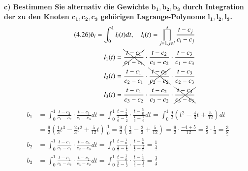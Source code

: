 \documentclass[10pt,a4paper]{article}
\begin{document}
    \textbf{%
        c) Bestimmen Sie alternativ die Gewichte $\pmb{b_1, b_2, b_3}$ durch Integration der zu den Knoten $\pmb{c_1, c_2, c_3}$ gehörigen Lagrange-Polynome $\pmb{l_1, l_2, l_3}$.
    }\\
		\begin{align*}\tag{4.26}
			b_i=\int_{0}^{1}l_i(t)dt, \quad l_i(t)=\prod_{j=1, j\neq i}^{s}\frac{t-c_j}{c_i-c_j} \\
			l_1(t) = \bcancel{\cancel{\frac{t-c_1}{c_1-c_1}}} \cdot \frac{t-c_2}{c_1-c_2} \cdot \frac{t-c_3}{c_1-c_3} \\
			l_2(t) = \frac{t-c_1}{c_2-c_1} \cdot \bcancel{\cancel{\frac{t-c_2}{c_2-c_2}}} \cdot  \frac{t-c_3}{c_2-c_3} \\
			l_3(t) = \frac{t-c_1}{c_3-c_2} \cdot \frac{t-c_2}{c_3-c_2} \cdot  \bcancel{\cancel{\frac{t-c_3}{c_3-c_3}}}
		\end{align*}
		\begin{align*}
			b_1 &= \int_{0}^{1} \frac{t-c_2}{c_1-c_2} \cdot \frac{t-c_3}{c_1-c_3} dt = 
				\int_{0}^{1} \frac{t-\frac{1}{2}}{\frac{1}{6}-\frac{1}{2}} \cdot \frac{t-\frac{5}{6}}{\frac{1}{6}-\frac{5}{6}} dt =
				\int_{0}^{1} \frac{9}{2}\left(t^2-\frac{4}{3}t+\frac{5}{12} \right) dt \\
				&= \frac{9}{2}\left(\frac{1}{3}t^3-\frac{2}{3}t^2+\frac{5}{12}t \right)\biggr\rvert^1_{0} = \frac{9}{2}\left(\frac{1}{3}-\frac{2}{3}+\frac{5}{12} \right) = \frac{9}{2}\cdot \frac{-4+5}{12} = \frac{3}{2}\cdot \frac{1}{4} =\underline{\frac{3}{8}} \\
			b_2 &= \int_{0}^{1} \frac{t-c_1}{c_2-c_1} \cdot \frac{t-c_3}{c_2-c_3} dt = 
				\int_{0}^{1} \frac{t-\frac{1}{6}}{\frac{1}{2}-\frac{1}{6}} \cdot  \frac{t-\frac{5}{6}}{\frac{1}{2}-\frac{5}{6}} = \underline{\frac{1}{4}}\\
			b_3 &= \int_{0}^{1} \frac{t-c_1}{c_3-c_2} \cdot \frac{t-c_2}{c_3-c_2} dt =
				\int_{0}^{1}	\frac{t-\frac{1}{6}}{\frac{5}{6}-\frac{1}{2}} \cdot \frac{t-\frac{1}{2}}{\frac{5}{6}-\frac{1}{2}} = \underline{\frac{3}{4}}
		\end{align*}
		
\end{document}
